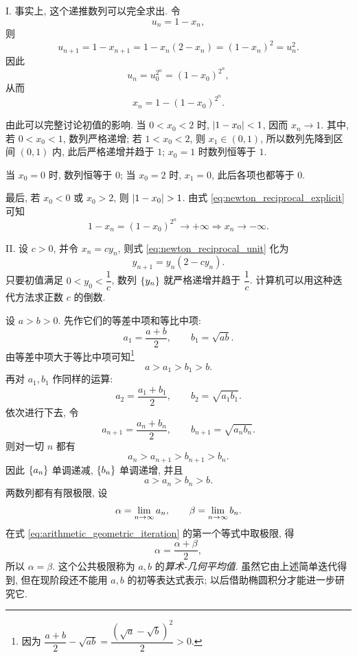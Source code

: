 \begin{remark}
I. 事实上, 这个递推数列可以完全求出. 令
$$
u_n=1-x_n,
$$
则
$$
u_{n+1}=1-x_{n+1}
=1-x_n(2-x_n)
=(1-x_n)^2
=u_n^2.
$$
因此
$$
u_n=u_0^{2^n}=(1-x_0)^{2^n},
$$
从而
\begin{equation}\label{eq:newton_reciprocal_explicit}
x_n=1-(1-x_0)^{2^n}.
\end{equation}

由此可以完整讨论初值的影响. 当 $0<x_0<2$ 时,
$\left| 1-x_0 \right|<1$, 因而 $x_n\to1$. 其中, 若 $0<x_0<1$,
数列严格递增; 若 $1<x_0<2$, 则 $x_1\in(0,1)$,
所以数列先降到区间 $(0,1)$ 内, 此后严格递增并趋于 $1$;
$x_0=1$ 时数列恒等于 $1$.

当 $x_0=0$ 时, 数列恒等于 $0$; 当 $x_0=2$ 时,
$x_1=0$, 此后各项也都等于 $0$.

最后, 若 $x_0<0$ 或 $x_0>2$, 则 $\abs{1-x_0}>1$.
由式 \eqref{eq:newton_reciprocal_explicit} 可知
$$
1-x_n = (1-x_0)^{2^n}\to+\infty \Rightarrow x_n\to-\infty.
$$

II. 设 $c>0$, 并令 $x_n=cy_n$, 则式 \eqref{eq:newton_reciprocal_unit} 化为
$$
y_{n+1}=y_n(2-cy_n).
$$
只要初值满足 $0<y_0<\dfrac1c$, 数列 $\{y_{n}\}$ 就严格递增并趋于 $\dfrac1c$.
计算机可以用这种迭代方法求正数 $c$ 的倒数.
\end{remark}

\label{ex:arithmetic_geometric_mean}
设 $a>b>0$. 先作它们的等差中项和等比中项:
$$
a_1=\frac{a+b}{2},\qquad b_1=\sqrt{ab}.
$$
由等差中项大于等比中项可知\footnote{因为
$\dfrac{a+b}{2}-\sqrt{ab}=\dfrac{(\sqrt a-\sqrt b)^2}{2}>0$.}
$$
a>a_1>b_1>b.
$$
再对 $a_1,b_1$ 作同样的运算:
$$
a_2=\frac{a_1+b_1}{2},\qquad b_2=\sqrt{a_1b_1}.
$$
依次进行下去, 令
\begin{equation}\label{eq:arithmetic_geometric_iteration}
a_{n+1}=\frac{a_n+b_n}{2},\qquad b_{n+1}=\sqrt{a_nb_n}.
\end{equation}
则对一切 $n$ 都有
$$
a_n>a_{n+1}>b_{n+1}>b_n.
$$
因此 $\{a_{n}\}$ 单调递减, $\{b_{n}\}$ 单调递增, 并且
$$
a>a_n>b_n>b.
$$
两数列都有有限极限, 设
$$
\alpha=\lim\limits_{n \to \infty}a_n,\qquad \beta=\lim\limits_{n \to \infty}b_n.
$$
在式 \eqref{eq:arithmetic_geometric_iteration} 的第一个等式中取极限, 得
$$
\alpha=\frac{\alpha+\beta}{2},
$$
所以 $\alpha=\beta$. 这个公共极限称为 $a,b$ 的\emph{算术-几何平均值}.
虽然它由上述简单迭代得到, 但在现阶段还不能用 $a,b$ 的初等表达式表示;
以后借助椭圆积分才能进一步研究它.

